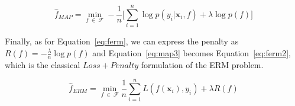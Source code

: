 \begin{equation} \label{eq:map3}
	\hat f_{MAP} = \min_{f~\in~\mathcal{F}} - \frac{1}{n} \bigg[ \sum_{i=1}^n \log p(y_i|\bm{x}_i,f) + \lambda \log p(f) \bigg]
\end{equation}

Finally, as for Equation~\eqref{eq:ferm}, we can express the penalty as $R(f) = - \frac{\lambda}{n} \log p(f)$ and Equation~\eqref{eq:map3} becomes Equation~\eqref{eq:ferm2}, which is the classical $Loss + Penalty$ formulation of the ERM problem.

\begin{equation} \label{eq:ferm2}
	\hat f_{ERM} = \min_{f~\in~\mathcal{F}} \frac{1}{n} \sum_{i=1}^n L(f(\bm{x}_i), y_i) + \lambda R(f)
\end{equation}
